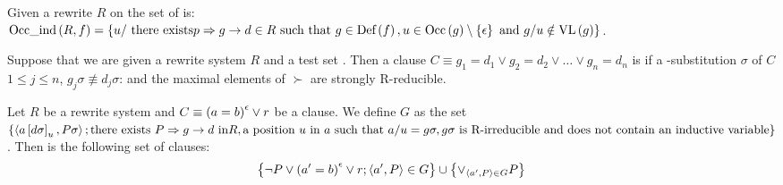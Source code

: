 \begin{defi}
Given a rewrite $R$ on  the set of  is: $\mbox{Occ\_ind}\left(R,f\right)=\left\{ u/\mbox{ there exists{}} p\Rightarrow g \rightarrow d\in R\mbox{ such that{} }g\in\mbox{Def}\left(f\right),u\in\mbox{Occ}\left(g\right)\setminus\left\{ \epsilon\right\}\mbox{ and }g/u\notin\mbox{VL}\left(g\right)\right\}$.
\cite{conf/ijcai/BouhoulaR93}
\end{defi}

\begin{defi}
Suppose that we are given a rewrite system $R$ and a test set . Then a clause $C\equiv g_1=d_1\vee g_2=d_2\vee\ldots\vee g_n=d_n$ is  if \tiTx{} a -substitution $\sigma$ of $C$ \stTx{} \faTx{} $1\leq j\leq n$, $g_j\sigma\not\equiv d_j\sigma$: and the maximal elements of  \wrtTx{} $\succ$ are strongly R-reducible.
\cite{conf/ijcai/BouhoulaR93}
\end{defi}

\begin{defi}
Let $R$ be a rewrite system and $C\equiv\left( a=b\right)^{\epsilon}\vee r$ be a clause. We define $G$ as the set $\left\{ \left\langle a\left[ d\sigma\right]_u,P\sigma\right\rangle; \mbox{there exists{} }P\Rightarrow g\rightarrow d\mbox{ in}R,\mbox{a position }u\mbox{ in }a\mbox{ such that{} }a/u=g\sigma, g\sigma\mbox{ is R-irreducible and does not contain an inductive variable}\right\}$. Then  is the following set of clauses:
\begin{equation}
\left\{ \neg P\vee\left( a'=b\right)^{\epsilon}\vee r; \left\langle a',P\right\rangle\in G\right\}\cup\left\{ \displaystyle\vee_{\left\langle a',P\right\rangle\in G}P\right\}
\end{equation}
\cite{conf/ijcai/BouhoulaR93}
\end{defi}

